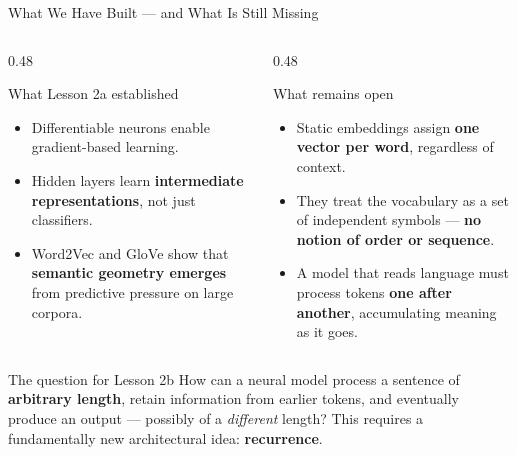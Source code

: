 \documentclass[11pt,aspectratio=169,professionalfonts]{beamer}
\begin{document}
\begin{frame}{What We Have Built --- and What Is Still Missing}
\begin{columns}[T]
\begin{column}{0.48\textwidth}
\begin{block}{What Lesson 2a established}
\begin{itemize}
    \item Differentiable neurons enable gradient-based learning.
    \item Hidden layers learn \textbf{intermediate representations},
          not just classifiers.
    \item Word2Vec and GloVe show that \textbf{semantic geometry
          emerges} from predictive pressure on large corpora.
\end{itemize}
\end{block}
\end{column}
\begin{column}{0.48\textwidth}
\begin{alertblock}{What remains open}
\begin{itemize}
    \item Static embeddings assign \textbf{one vector per word},
          regardless of context.
    \item They treat the vocabulary as a set of independent symbols ---
          \textbf{no notion of order or sequence}.
    \item A model that reads language must process tokens
          \textbf{one after another}, accumulating meaning as it goes.
\end{itemize}
\end{alertblock}
\end{column}
\end{columns}

\vspace{0.2cm}
\begin{block}{The question for Lesson 2b}
How can a neural model process a sentence of \textbf{arbitrary length},
retain information from earlier tokens, and eventually produce an output
--- possibly of a \emph{different} length?
This requires a fundamentally new architectural idea: \textbf{recurrence}.
\end{block}
\end{frame}
%
\end{document}
